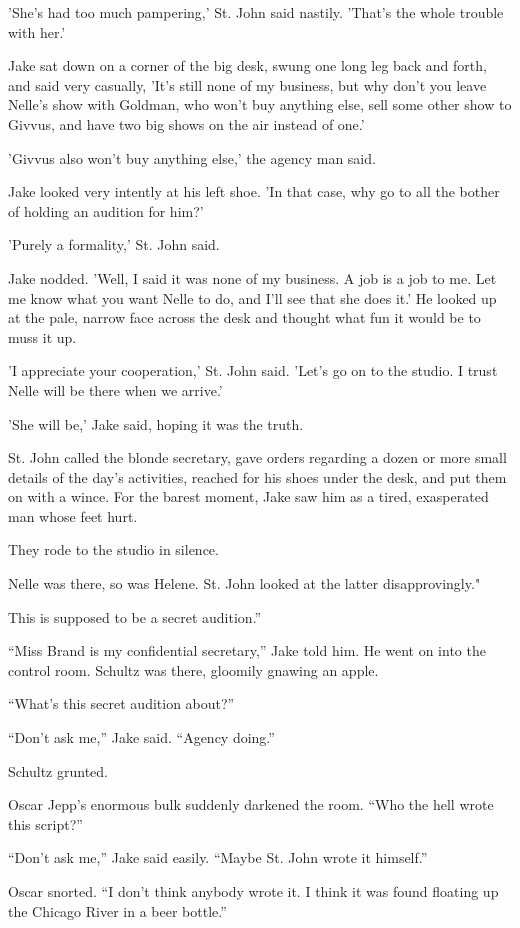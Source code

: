 \documentclass{novel}
\begin{document}
'She’s had too much pampering,' St. John said nastily. 'That’s the whole trouble with her.'

Jake sat down on a corner of the big desk, swung one long leg back and forth, and said very casually, 'It’s still none of my business, but why don’t you leave Nelle’s show with Goldman, who won’t buy anything else, sell some other show to Givvus, and have two big shows on the air instead of one.'

'Givvus also won’t buy anything else,' the agency man said.

Jake looked very intently at his left shoe. 'In that case, why go to all the bother of holding an audition for him?'

'Purely a formality,' St. John said.

Jake nodded. 'Well, I said it was none of my business. A job is a job to me. Let me know what you want Nelle to do, and I'll see that she does it.' He looked up at the pale, narrow face across the desk and thought what fun it would be to muss it up.

'I appreciate your cooperation,' St. John said. 'Let’s go on to the studio. I trust Nelle will be there when we arrive.'

'She will be,' Jake said, hoping it was the truth.

St. John called the blonde secretary, gave orders regarding a dozen or more small details of the day’s activities, reached for his shoes under the desk, and put them on with a wince. For the barest moment, Jake saw him as a tired, exasperated man whose feet hurt.

They rode to the studio in silence.

Nelle was there, so was Helene. St. John looked at the latter disapprovingly."

This is supposed to be a secret audition.”

“Miss Brand is my confidential secretary,” Jake told him. He went on into the control room. Schultz was there, gloomily gnawing an apple.

“What’s this secret audition about?”

“Don’t ask me,” Jake said. “Agency doing.”

Schultz grunted.

Oscar Jepp’s enormous bulk suddenly darkened the room. “Who the hell wrote this script?”

“Don’t ask me,” Jake said easily. “Maybe St. John wrote it himself.”

Oscar snorted. “I don’t think anybody wrote it. I think it was found floating up the Chicago River in a beer bottle.”
\end{document}
